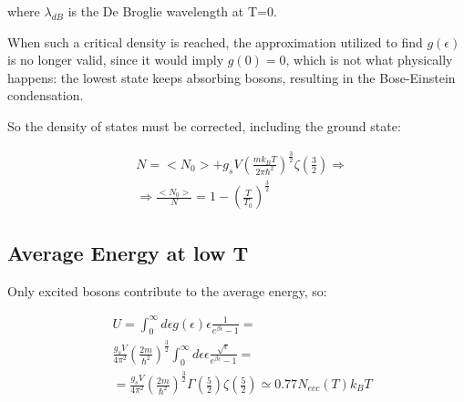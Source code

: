 \documentclass{article}
\begin{document}
where $\lambda_{dB}$ is the De Broglie wavelength at T=0.

When such a critical density is reached, the approximation utilized to find $g(\epsilon)$ is no
longer valid, since it would imply $g(0)=0$, which is not what physically happens: the lowest state keeps
absorbing bosons, resulting in the Bose-Einstein condensation.

So the density of states must be corrected, including the ground state:

\begin{equation}
    \begin{aligned}
         & N=<N_0>+g_s V \left(\frac{mk_BT}{2\pi \hbar^2}\right)^{\frac{3}{2}}\zeta\left(\frac{3}{2}\right) \Longrightarrow \\
         & \Longrightarrow \frac{<N_0>}{N}=1-\left(\frac{T}{T_0}\right)^{\frac{3}{2}}
    \end{aligned}
\end{equation}

\subsection{Average Energy at low T}

Only excited bosons contribute to the average energy, so:

\begin{equation}
    \begin{aligned}
         & U=\int_0^\infty d\epsilon g(\epsilon) \epsilon\frac{1}{e^{\beta\epsilon}-1}=                                                                           \\
         & \frac{g_sV}{4\pi^2}\left(\frac{2m}{\hbar^2}\right)^{\frac{3}{2}}\int_0^\infty d\epsilon \epsilon\frac{\sqrt{\epsilon}}{e^{\beta\epsilon}-1}=           \\
         & = \frac{g_sV}{4\pi^2}\left(\frac{2m}{\hbar^2}\right)^{\frac{3}{2}}\Gamma\left(\frac{5}{2}\right)\zeta\left(\frac{5}{2}\right)\simeq 0.77N_{ecc}(T)k_BT
    \end{aligned}
\end{equation}

\newpage
\end{document}
